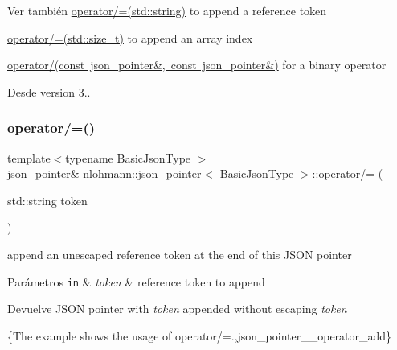 \begin{DoxySeeAlso}{Ver también}
\mbox{\hyperlink{classnlohmann_1_1json__pointer_abdd21567b2b1d69329af0f520335e68b}{operator/=(std\+::string)}} to append a reference token 

\mbox{\hyperlink{classnlohmann_1_1json__pointer_a64c8401529131bad1e486d91d703795f}{operator/=(std\+::size\+\_\+t)}} to append an array index 

\mbox{\hyperlink{classnlohmann_1_1json__pointer_a90a11fe6c7f37b1746a3ff9cb24b0d53}{operator/(const json\+\_\+pointer\&, const json\+\_\+pointer\&)}} for a binary operator
\end{DoxySeeAlso}
\begin{DoxySince}{Desde}
version 3.. 
\end{DoxySince}
\mbox{\label{classnlohmann_1_1json__pointer_abdd21567b2b1d69329af0f520335e68b}} 
\subsubsection{\texorpdfstring{operator/=()}{operator/=()}\hspace{0.1cm}{\footnotesize\ttfamily [2/3]}}
{\footnotesize\ttfamily template$<$typename Basic\+Json\+Type $>$ \\
\mbox{\hyperlink{classnlohmann_1_1json__pointer}{json\+\_\+pointer}}\& \mbox{\hyperlink{classnlohmann_1_1json__pointer}{nlohmann\+::json\+\_\+pointer}}$<$ Basic\+Json\+Type $>$\+::operator/= (\begin{DoxyParamCaption}\item[{std\+::string}]{token }\end{DoxyParamCaption})\hspace{0.3cm}{\ttfamily [inline]}}



append an unescaped reference token at the end of this J\+S\+ON pointer 


\begin{DoxyParams}[1]{Parámetros}
\mbox{\tt in}  & {\em token} & reference token to append \\
\hline
\end{DoxyParams}
\begin{DoxyReturn}{Devuelve}
J\+S\+ON pointer with {\itshape token} appended without escaping {\itshape token} 
\end{DoxyReturn}
\{The example shows the usage of {\ttfamily operator/=}.,json\+\_\+pointer\+\_\+\+\_\+operator\+\_\+add\}

